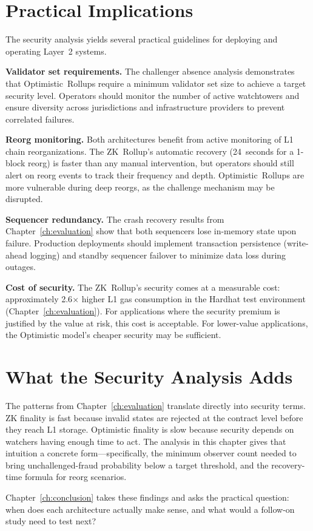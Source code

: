 \section{Practical Implications}

The security analysis yields several practical guidelines for deploying and operating Layer~2 systems.

\textbf{Validator set requirements.} The challenger absence analysis demonstrates that Optimistic~Rollups require a minimum validator set size to achieve a target security level. Operators should monitor the number of active watchtowers and ensure diversity across jurisdictions and infrastructure providers to prevent correlated failures.

\textbf{Reorg monitoring.} Both architectures benefit from active monitoring of L1 chain reorganizations. The ZK~Rollup's automatic recovery (24~seconds for a 1-block reorg) is faster than any manual intervention, but operators should still alert on reorg events to track their frequency and depth. Optimistic~Rollups are more vulnerable during deep reorgs, as the challenge mechanism may be disrupted.

\textbf{Sequencer redundancy.} The crash recovery results from Chapter~\ref{ch:evaluation} show that both sequencers lose in-memory state upon failure. Production deployments should implement transaction persistence (write-ahead logging) and standby sequencer failover to minimize data loss during outages.

\textbf{Cost of security.} The ZK~Rollup's security comes at a measurable cost: approximately 2.6$\times$ higher L1 gas consumption in the Hardhat test environment (Chapter~\ref{ch:evaluation}). For applications where the security premium is justified by the value at risk, this cost is acceptable. For lower-value applications, the Optimistic model's cheaper security may be sufficient.

\section{What the Security Analysis Adds}

The patterns from Chapter~\ref{ch:evaluation} translate directly into security terms. ZK finality is fast because invalid states are rejected at the contract level before they reach L1 storage. Optimistic finality is slow because security depends on watchers having enough time to act. The analysis in this chapter gives that intuition a concrete form---specifically, the minimum observer count needed to bring unchallenged-fraud probability below a target threshold, and the recovery-time formula for reorg scenarios.

Chapter~\ref{ch:conclusion} takes these findings and asks the practical question: when does each architecture actually make sense, and what would a follow-on study need to test next?

